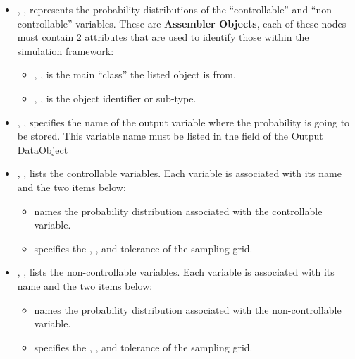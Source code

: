 \begin{itemize}
  \item {}, , represents the probability
  distributions of the ``controllable'' and ``non-controllable'' variables.
  These are \textbf{Assembler Objects}, each of these nodes must contain 2
  attributes that are used to identify those within the simulation framework:
        \begin{itemize}
    \item {}, , is the main
    ``class'' the listed object is from.
                \item {}, , is the object
    identifier or sub-type.
        \end{itemize}
             \item  {}, , specifies the name of the output variable where the probability is going to be stored.
               \nb This variable name must be listed in the  field of the Output DataObject
        \item {}, ,  lists the controllable variables.
  Each variable is associated with its name and the two items below:
        \begin{itemize}
                \item {} names the probability distribution associated
    with the controllable variable.
                \item {} specifies the , , and
    tolerance of the sampling grid.
        \end{itemize}
        \item {}, , lists the non-controllable variables.
  Each variable is associated with its name and the two items below:
        \begin{itemize}
                \item {} names the probability distribution associated
    with the non-controllable variable.
                \item {} specifies the , , and
    tolerance of the sampling grid.
                \end{itemize}
\end{itemize}


